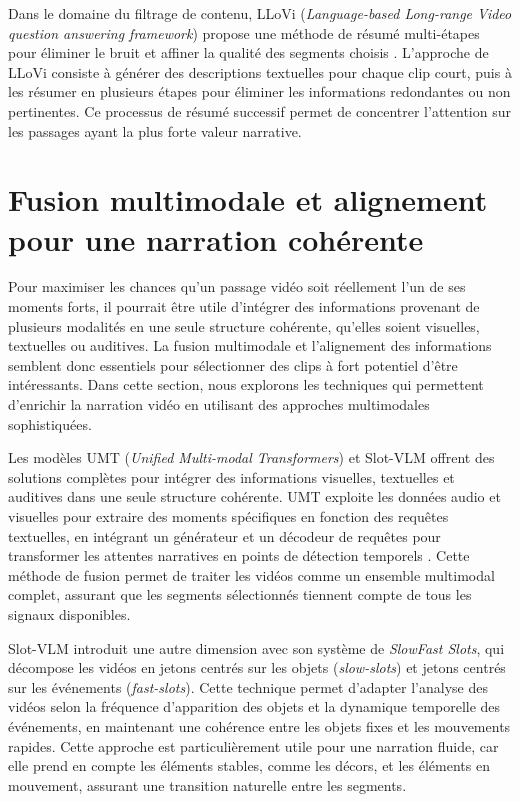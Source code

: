 Dans le domaine du filtrage de contenu, LLoVi (\textit{Language-based Long-range Video question answering framework}) \cite{zhang2023} propose une méthode de résumé multi-étapes pour éliminer le bruit et affiner la qualité des segments choisis \cite{anonymous2023_valley}\cite{zhang2019_memory}. L’approche de LLoVi consiste à générer des descriptions textuelles pour chaque clip court, puis à les résumer en plusieurs étapes pour éliminer les informations redondantes ou non pertinentes. Ce processus de résumé successif permet de concentrer l’attention sur les passages ayant la plus forte valeur narrative. 

\section{Fusion multimodale et alignement pour une narration cohérente}

Pour maximiser les chances qu’un passage vidéo soit réellement l’un de ses moments forts, il pourrait être utile d’intégrer des informations provenant de plusieurs modalités en une seule structure cohérente, qu’elles soient visuelles, textuelles ou auditives. La fusion multimodale et l’alignement des informations semblent donc essentiels pour sélectionner des clips à fort potentiel d’être intéressants. Dans cette section, nous explorons les techniques qui permettent d’enrichir la narration vidéo en utilisant des approches multimodales sophistiquées. 

Les modèles UMT (\textit{Unified Multi-modal Transformers}) \cite{liu2022_umt} et Slot-VLM \cite{xu2024} offrent des solutions complètes pour intégrer des informations visuelles, textuelles et auditives dans une seule structure cohérente. UMT exploite les données audio et visuelles pour extraire des moments spécifiques en fonction des requêtes textuelles, en intégrant un générateur et un décodeur de requêtes pour transformer les attentes narratives en points de détection temporels \cite{liu2022_umt}. Cette méthode de fusion permet de traiter les vidéos comme un ensemble multimodal complet, assurant que les segments sélectionnés tiennent compte de tous les signaux disponibles.

Slot-VLM  \cite{xu2024} introduit une autre dimension avec son système de \textit{SlowFast Slots}, qui décompose les vidéos en jetons centrés sur les objets (\textit{slow-slots}) et jetons centrés sur les événements (\textit{fast-slots}). Cette technique permet d’adapter l’analyse des vidéos selon la fréquence d’apparition des objets et la dynamique temporelle des événements, en maintenant une cohérence entre les objets fixes et les mouvements rapides. Cette approche est particulièrement utile pour une narration fluide, car elle prend en compte les éléments stables, comme les décors, et les éléments en mouvement, assurant une transition naturelle entre les segments.

